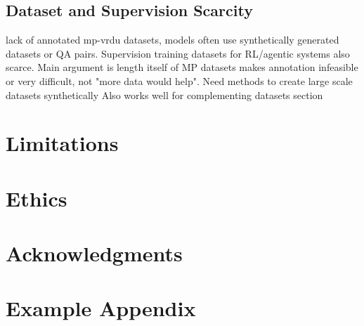\documentclass[11pt]{article}
\begin{document}
\subsection{Dataset and Supervision Scarcity}
lack of annotated mp-vrdu datasets, models often use synthetically generated datasets or QA pairs. Supervision training datasets for RL/agentic systems also scarce.
Main argument is length itself of MP datasets makes annotation infeasible or very difficult, not "more data would help". Need methods to create large scale datasets synthetically
Also works well for complementing datasets section

\section{Limitations}

\section{Ethics}

\section*{Acknowledgments}

%


\appendix

\section{Example Appendix}
\label{sec:appendix}






\end{document}
